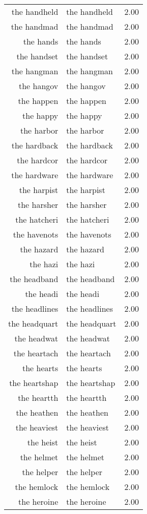 \begin{table}[ht]
\begin{tabular}{rlr}
  the handheld & the handheld & 2.00 \\ 
  the handmad & the handmad & 2.00 \\ 
  the hands & the hands & 2.00 \\ 
  the handset & the handset & 2.00 \\ 
  the hangman & the hangman & 2.00 \\ 
  the hangov & the hangov & 2.00 \\ 
  the happen & the happen & 2.00 \\ 
  the happy & the happy & 2.00 \\ 
  the harbor & the harbor & 2.00 \\ 
  the hardback & the hardback & 2.00 \\ 
  the hardcor & the hardcor & 2.00 \\ 
  the hardware & the hardware & 2.00 \\ 
  the harpist & the harpist & 2.00 \\ 
  the harsher & the harsher & 2.00 \\ 
  the hatcheri & the hatcheri & 2.00 \\ 
  the havenots & the havenots & 2.00 \\ 
  the hazard & the hazard & 2.00 \\ 
  the hazi & the hazi & 2.00 \\ 
  the headband & the headband & 2.00 \\ 
  the headi & the headi & 2.00 \\ 
  the headlines & the headlines & 2.00 \\ 
  the headquart & the headquart & 2.00 \\ 
  the headwat & the headwat & 2.00 \\ 
  the heartach & the heartach & 2.00 \\ 
  the hearts & the hearts & 2.00 \\ 
  the heartshap & the heartshap & 2.00 \\ 
  the heartth & the heartth & 2.00 \\ 
  the heathen & the heathen & 2.00 \\ 
  the heaviest & the heaviest & 2.00 \\ 
  the heist & the heist & 2.00 \\ 
  the helmet & the helmet & 2.00 \\ 
  the helper & the helper & 2.00 \\ 
  the hemlock & the hemlock & 2.00 \\ 
  the heroine & the heroine & 2.00 \\ 

\end{tabular}
\end{table}
